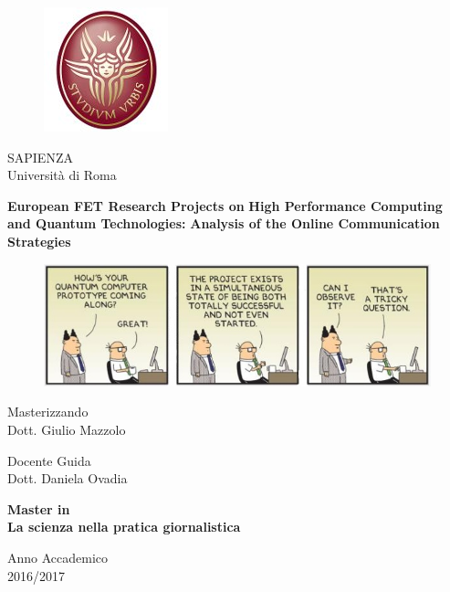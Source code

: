 \documentclass[12pt,a4paper,openright]{book}
\begin{document}
 
 
 \begin{figure}[!t] 
   \begin{center}
   \includegraphics[scale=0.3]{Images/Logo_sapienza.jpg}
   \end{center}
 \end{figure}  
 
 \begin{center}
   SAPIENZA \\
   Universit\`a di Roma \\
 \end{center}  

 \vspace{10mm}
   
 \begin{center}  
   \textbf{European FET Research Projects on}
   \textbf{High Performance Computing and Quantum Technologies:}
   \textbf{Analysis of the Online Communication Strategies}\\
 \end{center} 

 \vspace{5mm}
 
 \begin{figure}[h] 
   \begin{center}
   \includegraphics[scale=0.5]{Images/Front_image_no_credits.jpg}
   \end{center}
 \end{figure} 

 \begin{center}
   Masterizzando\\
   Dott. Giulio Mazzolo
 \end{center}

 \vspace{5mm}

 \begin{flushleft}
   Docente Guida\\ 
   Dott. Daniela Ovadia
 \end{flushleft}

 \vspace{5mm}

 \begin{center}
   \textbf{Master in} \\
   \textbf{La scienza nella pratica giornalistica}\\
   
   \vspace{5mm}
   
   Anno Accademico\\ 
   2016/2017 
 \end{center}
\end{document}
